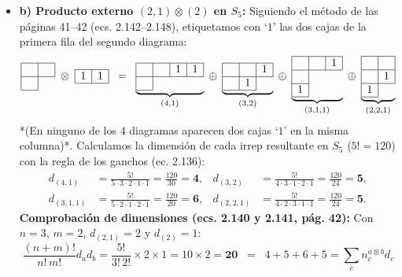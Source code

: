 \documentclass[11pt, a4paper]{article}
\begin{document}
\begin{itemize}
    \item \textbf{b) Producto externo $(2,1) \otimes (2)$ en $S_5$:}
    Siguiendo el método de las páginas 41--42 (ecs. 2.142--2.148), etiquetamos con `$1$' las dos cajas de la primera fila del segundo diagrama:
    \[
    \begin{array}{|c|c|} \hline \phantom{1} & \phantom{1} \\ \hline \phantom{1} & \multicolumn{1}{c}{} \\ \cline{1-1} \end{array} \;\otimes\; \begin{array}{|c|c|} \hline 1 & 1 \\ \hline \end{array}
    \;\; = \;\;
    \underbrace{\begin{array}{|c|c|c|c|} \hline \phantom{1} & \phantom{1} & 1 & 1 \\ \hline \phantom{1} & \multicolumn{3}{c}{} \\ \cline{1-1} \end{array}}_{(4,1)}
    \;\oplus\;
    \underbrace{\begin{array}{|c|c|c|} \hline \phantom{1} & \phantom{1} & 1 \\ \hline \phantom{1} & 1 & \multicolumn{1}{c}{} \\ \cline{1-2} \end{array}}_{(3,2)}
    \;\oplus\;
    \underbrace{\begin{array}{|c|c|c|} \hline \phantom{1} & \phantom{1} & 1 \\ \hline \phantom{1} & \multicolumn{2}{c}{} \\ \cline{1-1} 1 & \multicolumn{2}{c}{} \\ \cline{1-1} \end{array}}_{(3,1,1)}
    \;\oplus\;
    \underbrace{\begin{array}{|c|c|} \hline \phantom{1} & \phantom{1} \\ \hline \phantom{1} & 1 \\ \hline 1 & \multicolumn{1}{c}{} \\ \cline{1-1} \end{array}}_{(2,2,1)}
    \]
    *(En ninguno de los 4 diagramas aparecen dos cajas `$1$' en la misma columna)*. Calculamos la dimensión de cada irrep resultante en $S_5$ ($5! = 120$) con la regla de los ganchos (ec. 2.136):
    \begin{align*}
        d_{(4,1)} &= \frac{5!}{5 \cdot 3 \cdot 2 \cdot 1 \cdot 1} = \frac{120}{30} = \mathbf{4}, &
        d_{(3,2)} &= \frac{5!}{4 \cdot 3 \cdot 1 \cdot 2 \cdot 1} = \frac{120}{24} = \mathbf{5}, \\[4pt]
        d_{(3,1,1)} &= \frac{5!}{5 \cdot 2 \cdot 1 \cdot 2 \cdot 1} = \frac{120}{20} = \mathbf{6}, &
        d_{(2,2,1)} &= \frac{5!}{4 \cdot 2 \cdot 3 \cdot 1 \cdot 1} = \frac{120}{24} = \mathbf{5}.
    \end{align*}
    \textbf{Comprobación de dimensiones (ecs. 2.140 y 2.141, pág. 42):}
    Con $n = 3$, $m = 2$, $d_{(2,1)} = 2$ y $d_{(2)} = 1$:
    \[
    \frac{(n+m)!}{n! \, m!} d_a d_b = \frac{5!}{3! \, 2!} \times 2 \times 1 = 10 \times 2 = \mathbf{20} \;\; = \;\; 4 + 5 + 6 + 5 = \sum_c n_c^{a \otimes b} d_c
    \]
\end{itemize}
\end{document}
